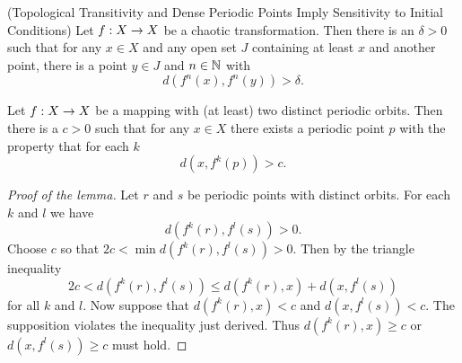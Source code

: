 \documentclass[12pt]{book}
\begin{document}
\begin{proposition}
  (Topological Transitivity and Dense Periodic Points Imply Sensitivity to Initial Conditions)
  Let $f: X\rightarrow X$ be a chaotic transformation. Then there is an $\delta > 0$ such that
  for any $x\in X$ and any open set $J$ containing at least $x$ and another point, there is
  a point $y\in J$ and $n\in \mathbb{N}$ with
  \begin{equation*}
    d(f^n(x),f^n(y)) > \delta.
  \end{equation*}
  \label{thm:sensitivity}
\end{proposition}
\begin{lemma}
  Let $f: X\rightarrow X$ be a mapping with (at least) two distinct periodic orbits.
  Then there is a $c > 0$ such that for any $x\in X$ there exists a periodic
  point $p$ with the property that for each $k$
  \begin{equation*}
    d(x, f^k(p)) > c.
  \end{equation*}
\end{lemma}
\begin{proof}[Proof of the lemma]
  Let $r$ and $s$ be periodic points with distinct orbits. For each $k$ and $l$ we have
  \begin{equation*}
    d(f^k(r), f^l(s)) > 0.
  \end{equation*}
  Choose $c$ so that $2c < \min d(f^k(r),f^l(s)) > 0$. Then by the triangle inequality
  \begin{equation*}
    2c < d(f^k(r),f^l(s)) \leq d(f^k(r),x) + d(x,f^l(s))
  \end{equation*}
  for all $k$ and $l$. Now suppose that $d(f^k(r),x)<c$ and $d(x,f^l(s))<c$. The supposition
  violates the inequality just derived. Thus $d(f^k(r),x) \geq c$ or $d(x,f^l(s)) \geq c$ must hold.
\end{proof}
\end{document}
